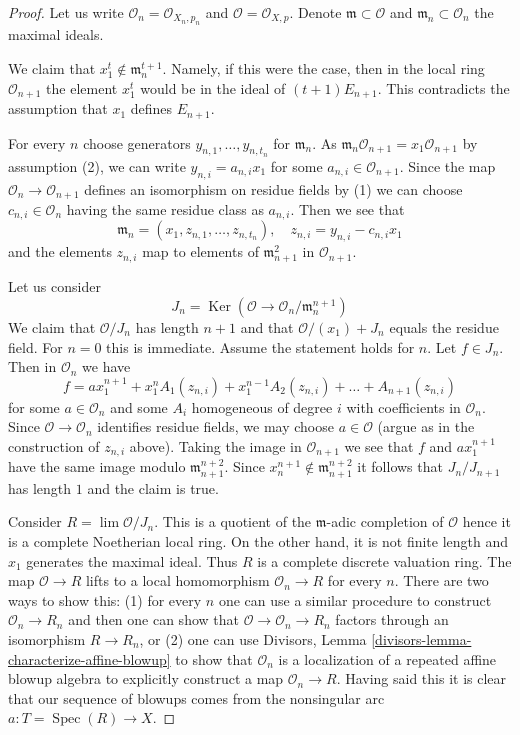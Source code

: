 \documentclass{stacks-project}
\theoremstyle{plain}
\theoremstyle{definition}
\theoremstyle{remark}
\numberwithin{equation}{subsection}
\def\lim{\mathop{\mathrm{lim}}\nolimits}
\def\Spec{\mathop{\mathrm{Spec}}}
\def\Ker{\mathop{\mathrm{Ker}}}
\begin{document}
\begin{proof}
Let us write $\mathcal{O}_n = \mathcal{O}_{X_n, p_n}$
and $\mathcal{O} = \mathcal{O}_{X, p}$. Denote
$\mathfrak m \subset \mathcal{O}$ and $\mathfrak m_n \subset \mathcal{O}_n$
the maximal ideals.

\medskip\noindent
We claim that $x_1^t \not \in \mathfrak m_n^{t + 1}$.
Namely, if this were the case, then in the local ring
$\mathcal{O}_{n + 1}$ the element $x_1^t$ would be in the ideal of
$(t + 1)E_{n + 1}$.
This contradicts the assumption that $x_1$ defines $E_{n + 1}$.

\medskip\noindent
For every $n$ choose generators $y_{n, 1}, \ldots, y_{n, t_n}$
for $\mathfrak m_n$. As
$\mathfrak m_n \mathcal{O}_{n + 1} = x_1\mathcal{O}_{n + 1}$
by assumption (2), we can write $y_{n, i} = a_{n, i} x_1$
for some $a_{n, i} \in \mathcal{O}_{n + 1}$. Since
the map $\mathcal{O}_n \to \mathcal{O}_{n + 1}$ defines
an isomorphism on residue fields by (1) we can choose
$c_{n, i} \in \mathcal{O}_n$ having the same residue class as
$a_{n, i}$. Then we see that
$$
\mathfrak m_n = (x_1, z_{n, 1}, \ldots, z_{n, t_n}),
\quad z_{n, i} = y_{n, i} - c_{n, i} x_1
$$
and the elements $z_{n, i}$ map to elements of $\mathfrak m_{n + 1}^2$
in $\mathcal{O}_{n + 1}$.

\medskip\noindent
Let us consider
$$
J_n = \Ker(\mathcal{O} \to \mathcal{O}_n/\mathfrak m_n^{n + 1})
$$
We claim that $\mathcal{O}/J_n$ has length $n + 1$ and that
$\mathcal{O}/(x_1) + J_n$ equals the residue field. For $n = 0$
this is immediate. Assume the statement holds for $n$.
Let $f \in J_n$. Then in $\mathcal{O}_n$ we have
$$
f = a x_1^{n + 1} + x_1^n A_1(z_{n, i}) +
x_1^{n - 1} A_2(z_{n, i}) + \ldots + A_{n + 1}(z_{n, i})
$$
for some $a \in \mathcal{O}_n$ and some $A_i$ homogeneous of degree $i$
with coefficients in $\mathcal{O}_n$. Since $\mathcal{O} \to \mathcal{O}_n$
identifies residue fields, we may choose $a \in \mathcal{O}$
(argue as in the construction of $z_{n, i}$ above).
Taking the image in
$\mathcal{O}_{n + 1}$ we see that $f$ and $a x_1^{n + 1}$
have the same image modulo $\mathfrak m_{n + 1}^{n + 2}$.
Since $x_n^{n + 1} \not \in \mathfrak m_{n + 1}^{n + 2}$
it follows that $J_n/J_{n + 1}$ has length $1$ and the claim is true.

\medskip\noindent
Consider $R = \lim \mathcal{O}/J_n$. This is a quotient of
the $\mathfrak m$-adic completion of $\mathcal{O}$ hence it is
a complete Noetherian local ring. On the other hand, it is
not finite length and $x_1$ generates the maximal ideal.
Thus $R$ is a complete discrete valuation ring.
The map $\mathcal{O} \to R$ lifts to a local homomorphism
$\mathcal{O}_n \to R$ for every $n$. There are two ways to show this:
(1) for every $n$ one can use a similar procedure
to construct $\mathcal{O}_n \to R_n$ and then one can
show that $\mathcal{O} \to \mathcal{O}_n \to R_n$ factors
through an isomorphism $R \to R_n$, or (2) one can use
Divisors, Lemma \ref{divisors-lemma-characterize-affine-blowup}
to show that $\mathcal{O}_n$ is a localization of a repeated
affine blowup algebra to explicitly construct a map $\mathcal{O}_n \to R$.
Having said this it is clear that our sequence of blowups
comes from the nonsingular arc $a : T = \Spec(R) \to X$.
\end{proof}
\end{document}
